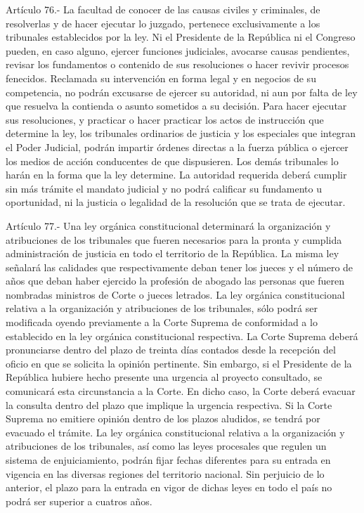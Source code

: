     Artículo 76.- La facultad de conocer de las causas civiles y criminales, de resolverlas y de hacer ejecutar lo juzgado, pertenece exclusivamente a los tribunales establecidos por la ley. Ni el Presidente de la República ni el Congreso pueden, en caso alguno, ejercer funciones judiciales, avocarse causas pendientes, revisar los fundamentos o contenido de sus resoluciones o hacer revivir procesos fenecidos.
    Reclamada su intervención en forma legal y en negocios de su competencia, no podrán excusarse de ejercer su autoridad, ni aun por falta de ley que resuelva la contienda o asunto sometidos a su decisión.
    Para hacer ejecutar sus resoluciones, y practicar o hacer practicar los actos de instrucción que determine la ley, los tribunales ordinarios de justicia y los especiales que integran el Poder Judicial, podrán impartir órdenes directas a la fuerza pública o ejercer los medios de acción conducentes de que dispusieren. Los demás tribunales lo harán en la forma que la ley determine.
    La autoridad requerida deberá cumplir sin más trámite el mandato judicial y no podrá calificar su fundamento u oportunidad, ni la justicia o legalidad de la resolución que se trata de ejecutar.


    Artículo 77.- Una ley orgánica constitucional determinará la organización y atribuciones de los tribunales que fueren necesarios para la pronta y cumplida administración de justicia en todo el territorio de la República. La misma ley señalará las calidades que respectivamente deban tener los jueces y el número de años que deban haber ejercido la profesión de abogado las personas que fueren nombradas ministros de Corte o jueces letrados. 
    La ley orgánica constitucional relativa a la organización y atribuciones de los tribunales, sólo podrá ser modificada oyendo previamente a la Corte Suprema de conformidad a lo establecido en la ley orgánica constitucional respectiva. 
    La Corte Suprema deberá pronunciarse dentro del plazo de treinta días contados desde la recepción del oficio en que se solicita la opinión pertinente. 
    Sin embargo, si el Presidente de la República hubiere hecho presente una urgencia al proyecto consultado, se comunicará esta circunstancia a la Corte. 
    En dicho caso, la Corte deberá evacuar la consulta dentro del plazo que implique la urgencia respectiva. 
    Si la Corte Suprema no emitiere opinión dentro de los plazos aludidos, se tendrá por evacuado el trámite.
    La ley orgánica constitucional relativa a la organización y atribuciones de los tribunales, así como las leyes procesales que regulen un sistema de enjuiciamiento, podrán fijar fechas diferentes para su entrada en vigencia en las diversas regiones del territorio nacional. Sin perjuicio de lo anterior, el plazo para la entrada en vigor de dichas leyes en todo el país no podrá ser superior a cuatros años.



